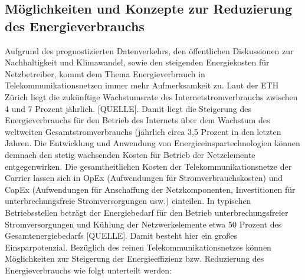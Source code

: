 \documentclass[12pt,titlepage]{article}
\begin{document}
\subsection{Möglichkeiten und Konzepte zur Reduzierung des Energieverbrauchs}
Aufgrund des prognostizierten Datenverkehrs, den öffentlichen Diskussionen zur Nachhaltigkeit und Klimawandel, sowie den steigenden Energiekosten für Netzbetreiber, kommt dem Thema Energieverbrauch in Telekommunikationsnetzen immer mehr Aufmerksamkeit zu. Laut der ETH Zürich liegt die zukünftige Wachstumsrate des Internetstromverbrauchs zwischen 4 und 7 Prozent jährlich. [QUELLE]. Damit liegt die Steigerung des Energieverbrauchs für den Betrieb des Internets über dem Wachstum des weltweiten Gesamtstromverbrauchs (jährlich circa 3,5 Prozent in den letzten Jahren.  Die Entwicklung und Anwendung von Energieeinspartechnologien können demnach den stetig wachsenden Kosten für Betrieb der Netzelemente entgegenwirken. 
Die gesamtheitlichen Kosten der Telekommunikationsnetze der Carrier lassen sich in OpEx (Aufwendungen für Stromverbrauchskosten) und CapEx (Aufwendungen für Anschaffung der Netzkomponenten, Investitionen für unterbrechungsfreie Stromversorgungen usw.) einteilen. In typischen Betriebsstellen beträgt der Energiebedarf für den Betrieb unterbrechungsfreier Stromversorgungen und Kühlung der Netzwerkelemente etwa 50 Prozent des Gesamtenergiebedarfs [QUELLE]. Damit besteht hier ein großes Einsparpotenzial. Bezüglich des reinen Telekommunikationsnetzes können Möglichkeiten zur Steigerung der Energieeffizienz bzw. Reduzierung des Energieverbrauchs wie folgt unterteilt werden:
\end{document}
